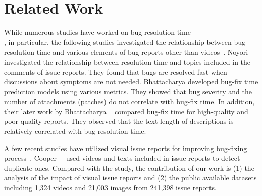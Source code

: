 \section{Related Work}
\label{sec:relate}
While numerous studies have worked on bug resolution time~\citep{DBLP:conf/msr/ChenNSH14}\citep{DBLP:journals/jss/GarciaSN18}\citep{DBLP:conf/sigsoft/JeongKZ09}\\
\citep{DBLP:conf/icsm/KashiwaYKO14}\citep{DBLP:conf/msr/ZamanAH11}, 
in particular, the following studies investigated the relationship between bug resolution time and various elements of bug reports other than videos~\citep{DBLP:conf/msr/BhattacharyaN11}\citep{DBLP:conf/csmr/BhattacharyaUNK13}\citep{DBLP:journals/ieicetd/NoyoriWFKONT21}. 
Noyori~\et~\citep{DBLP:journals/ieicetd/NoyoriWFKONT21} investigated the relationship between resolution time and topics included in the comments of issue reports. 
They found that bugs are resolved fast when discussions about symptoms are not needed.  Bhattacharya \et \citep{DBLP:conf/msr/BhattacharyaN11} developed bug-fix
time prediction models using various metrics. They showed that bug severity and the number of attachments (patches) do not correlate with bug-fix time. In addition, their later work by Bhattacharya \et~\citep{DBLP:conf/csmr/BhattacharyaUNK13} compared bug-fix time for high-quality and poor-quality reports. They observed that the text length of descriptions is relatively correlated with bug resolution time. 

A few recent studies have utilized visual issue reports for improving bug-fixing process~\citep{DBLP:conf/icse/CooperBCMP21}. Cooper~\et~\citep{DBLP:conf/icse/CooperBCMP21} used videos and texts included in issue reports to detect duplicate ones. Compared with the study, the contribution of our work is (1) the analysis of the impact of visual issue reports and (2) the public available datasets including 1,324 videos and 21,003 images from 241,398 issue reports.